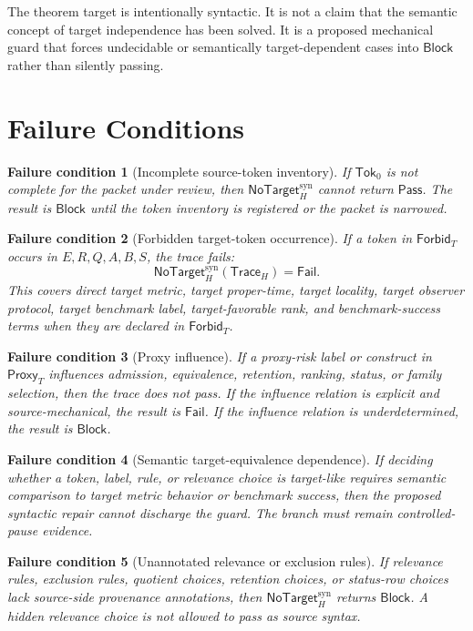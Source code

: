 \documentclass[11pt]{article}
\newcommand{\NoTargetSyn}{\mathsf{NoTarget}_{H}^{\mathrm{syn}}}
\newcommand{\SrcTok}{\mathsf{Tok}_{0}}
\newcommand{\ForbidT}{\mathsf{Forbid}_{T}}
\newcommand{\ProxyT}{\mathsf{Proxy}_{T}}
\newcommand{\TraceH}{\mathsf{Trace}_{H}}
\newcommand{\Pass}{\mathsf{Pass}}
\newcommand{\Fail}{\mathsf{Fail}}
\newcommand{\Block}{\mathsf{Block}}
\newtheorem{condition}{Failure condition}
\begin{document}
The theorem target is intentionally syntactic. It is not a claim that the
semantic concept of target independence has been solved. It is a proposed
mechanical guard that forces undecidable or semantically target-dependent
cases into \(\Block\) rather than silently passing.

\section{Failure Conditions}

\begin{condition}[Incomplete source-token inventory]
If \(\SrcTok\) is not complete for the packet under review, then
\(\NoTargetSyn\) cannot return \(\Pass\). The result is \(\Block\) until the
token inventory is registered or the packet is narrowed.
\end{condition}

\begin{condition}[Forbidden target-token occurrence]
If a token in \(\ForbidT\) occurs in \(E,R,Q,A,B,S\), the trace fails:
\[
    \NoTargetSyn(\TraceH)=\Fail.
\]
This covers direct target metric, target proper-time, target locality,
target observer protocol, target benchmark label, target-favorable rank, and
benchmark-success terms when they are declared in \(\ForbidT\).
\end{condition}

\begin{condition}[Proxy influence]
If a proxy-risk label or construct in \(\ProxyT\) influences admission,
equivalence, retention, ranking, status, or family selection, then the trace
does not pass. If the influence relation is explicit and source-mechanical,
the result is \(\Fail\). If the influence relation is underdetermined, the
result is \(\Block\).
\end{condition}

\begin{condition}[Semantic target-equivalence dependence]
If deciding whether a token, label, rule, or relevance choice is target-like
requires semantic comparison to target metric behavior or benchmark success,
then the proposed syntactic repair cannot discharge the guard. The branch
must remain controlled-pause evidence.
\end{condition}

\begin{condition}[Unannotated relevance or exclusion rules]
If relevance rules, exclusion rules, quotient choices, retention choices, or
status-row choices lack source-side provenance annotations, then
\(\NoTargetSyn\) returns \(\Block\). A hidden relevance choice is not allowed
to pass as source syntax.
\end{condition}
\end{document}
